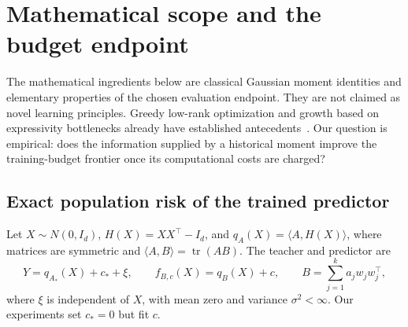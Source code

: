 \section{Mathematical scope and the budget endpoint}
\label{sec:p6-theory}

The mathematical ingredients below are classical Gaussian moment
identities and elementary properties of the chosen evaluation endpoint.
They are not claimed as novel learning principles. Greedy low-rank
optimization and growth based on expressivity bottlenecks already have
established antecedents~\cite{geco,tiny}. Our question is empirical:
does the information supplied by a historical moment improve the
training-budget frontier once its computational costs are charged?

\subsection{Exact population risk of the trained predictor}

Let $X\sim N(0,I_d)$, $H(X)=XX^\top-I_d$, and
$q_A(X)=\langle A,H(X)\rangle$, where matrices are symmetric and
$\langle A,B\rangle=\operatorname{tr}(AB)$. The teacher and predictor are
\begin{equation}
 Y=q_{A_*}(X)+c_*+\xi,
 \qquad f_{B,c}(X)=q_B(X)+c,
 \qquad B=\sum_{j=1}^k a_jw_jw_j^\top,
 \label{eq:p6-model}
\end{equation}
where $\xi$ is independent of $X$, with mean zero and variance
$\sigma^2<\infty$. Our experiments set $c_*=0$ but fit $c$.

